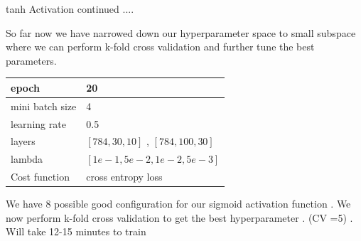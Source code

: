 \documentclass[12pt,t]{beamer}
\begin{document}
\begin{frame}[t]
    \large tanh Activation continued ....
    
    \scriptsize

    So far now we have narrowed down our hyperparameter space to small subspace where we can perform 
    k-fold cross validation and further tune the best parameters.

    \begin{center}
        \begin{tabular}{ | m{5em} | m{3cm} | } 
            \hline
            epoch & 20 \\ 
            \hline
            mini batch size  & 4 \\ 
            \hline
            learning rate & 0.5  \\ 
            \hline
            layers  & $[784,30,10]$ , $[784,100,30]$ \\
            \hline
            lambda & $[1e-1,5e-2,1e-2,5e-3]$ \\
            \hline
            Cost function & cross entropy loss \\
            \hline
          \end{tabular}  
    \end{center}

    We have 8 possible good configuration for our sigmoid activation function . We now perform k-fold cross 
    validation to get the best hyperparameter . (CV =5) . Will take 12-15 minutes to train

\end{frame}
\end{document}
